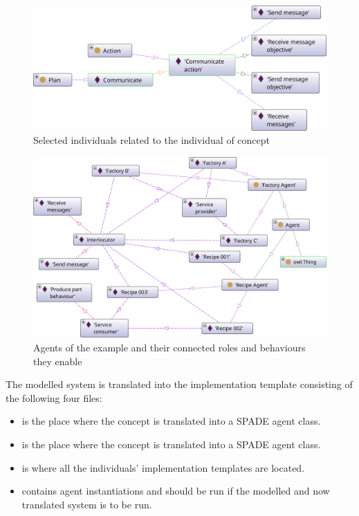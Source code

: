 \begin{figure}
    \centering
    \includegraphics[width=\linewidth]{Deliverables/Phase 1/Figures/Example Communicate plan.png}
    \caption{Selected individuals related to the  individual of concept }
    \label{fig: Example Communicate plan}
\end{figure}

\begin{figure}
    \centering
    \includegraphics[width=\linewidth]{Deliverables/Phase 1/Figures/Example agents and roles.png}
    \caption{Agents of the example and their connected roles and behaviours they enable}
    \label{fig: Example agents and roles}
\end{figure}

The modelled system is translated into the implementation template consisting of the following four files:
\begin{itemize}
    \item {} is the place where the  concept is translated into a \ac{SPADE} agent class.

    \item {} is the place where the  concept is translated into a \ac{SPADE} agent class.

    \item {} is where all the  individuals' implementation templates are located.

    \item {} contains agent instantiations and should be run if the modelled and now translated system is to be run.
\end{itemize}

